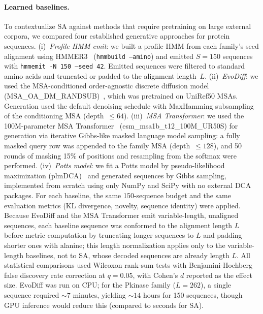 \paragraph{Learned baselines.}
To contextualize SA against methods that require pretraining on large external corpora, we compared four established generative approaches for protein sequences. (i)~\emph{Profile HMM emit}: we built a profile HMM from each family's seed alignment using HMMER3~\cite{hmmer3} (\texttt{hmmbuild --amino}) and emitted $S{=}150$ sequences with \texttt{hmmemit -N 150 --seed 42}. Emitted sequences were filtered to standard amino acids and truncated or padded to the alignment length~$L$. (ii)~\emph{EvoDiff}: we used the MSA-conditioned order-agnostic discrete diffusion model (MSA\_OA\_DM\_RANDSUB)~\cite{alamdariProteinGeneration2023}, which was pretrained on UniRef50 MSAs. Generation used the default denoising schedule with MaxHamming subsampling of the conditioning MSA (depth~$\leq 64$). (iii)~\emph{MSA Transformer}: we used the 100M-parameter MSA Transformer~\cite{raoMSATransformer2021} (esm\_msa1b\_t12\_100M\_UR50S) for generation via iterative Gibbs-like masked language model sampling: a fully masked query row was appended to the family MSA (depth~$\leq 128$), and 50 rounds of masking 15\% of positions and resampling from the softmax were performed. (iv)~\emph{Potts model}: we fit a Potts model by pseudo-likelihood maximization (plmDCA)~\cite{ekeberg2013improved} and generated sequences by Gibbs sampling, implemented from scratch using only NumPy and SciPy with no external DCA packages. For each baseline, the same 150-sequence budget and the same evaluation metrics (KL divergence, novelty, sequence identity) were applied. Because EvoDiff and the MSA Transformer emit variable-length, unaligned sequences, each baseline sequence was conformed to the alignment length $L$ before metric computation by truncating longer sequences to $L$ and padding shorter ones with alanine; this length normalization applies only to the variable-length baselines, not to SA, whose decoded sequences are already length $L$. All statistical comparisons used Wilcoxon rank-sum tests with Benjamini-Hochberg false discovery rate correction at $q{=}0.05$, with Cohen's $d$ reported as the effect size. EvoDiff was run on CPU; for the Pkinase family ($L{=}262$), a single sequence required ${\sim}7$ minutes, yielding ${\sim}14$ hours for 150 sequences, though GPU inference would reduce this (compared to seconds for SA).

